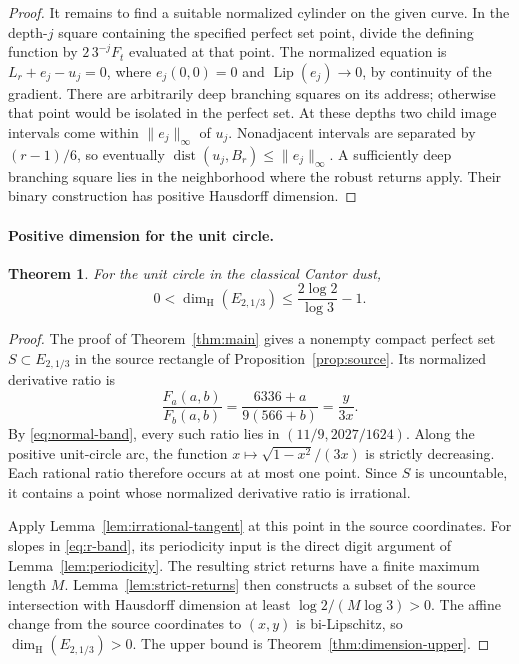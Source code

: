 \documentclass[11pt,a4paper]{amsart}
\numberwithin{equation}{section}
\newtheorem{theorem}{Theorem}[section]
\theoremstyle{definition}
\begin{document}
\begin{proof}
It remains to find a suitable normalized cylinder on the given
curve. In the depth-\(j\) square containing the specified perfect
set point, divide the defining function by
\(2\,3^{-j}F_t\) evaluated at that point. The normalized equation
is \(L_r+e_j-u_j=0\), where \(e_j(0,0)=0\) and
\(\operatorname{Lip}(e_j)\to0\), by continuity of the gradient.
There are arbitrarily deep branching squares on its address;
otherwise that point would be isolated in the perfect set.
At these depths two child image intervals come within
\(\|e_j\|_\infty\) of \(u_j\). Nonadjacent intervals are separated
by \((r-1)/6\), so eventually
\(\operatorname{dist}(u_j,B_r)\leq\|e_j\|_\infty\).
A sufficiently deep branching square lies in the neighborhood
where the robust returns apply. Their binary construction has
positive Hausdorff dimension.
\end{proof}

\paragraph{Positive dimension for the unit circle.}

\begin{theorem}\label{thm:circle-quantitative}
For the unit circle in the classical Cantor dust,
\[
0<\dim_{\mathrm H}(E_{2,1/3})
                  \leq\frac{2\log2}{\log3}-1 .
\]
\end{theorem}
\begin{proof}
The proof of Theorem~\ref{thm:main} gives a nonempty compact perfect
set \(S\subset E_{2,1/3}\) in the source rectangle of
Proposition~\ref{prop:source}. Its normalized derivative ratio is
\[
\frac{F_a(a,b)}{F_b(a,b)}
=\frac{6336+a}{9(566+b)}
=\frac{y}{3x}.
\]
By \eqref{eq:normal-band}, every such ratio lies in
\((11/9,2027/1624)\). Along the positive unit-circle arc,
the function \(x\mapsto\sqrt{1-x^2}/(3x)\) is strictly decreasing.
Each rational ratio therefore occurs at at most one point.
Since \(S\) is uncountable, it contains a point whose normalized
derivative ratio is irrational.

Apply Lemma~\ref{lem:irrational-tangent} at this point in the source
coordinates. For slopes in \eqref{eq:r-band}, its periodicity input
is the direct digit argument of Lemma~\ref{lem:periodicity}.
The resulting strict returns have a finite maximum length \(M\).
Lemma~\ref{lem:strict-returns} then constructs a subset of the
source intersection with Hausdorff dimension at least
\(\log2/(M\log3)>0\). The affine change from the source coordinates
to \((x,y)\) is bi-Lipschitz, so
\(\dim_{\mathrm H}(E_{2,1/3})>0\).
The upper bound is Theorem~\ref{thm:dimension-upper}.
\end{proof}
\end{document}
